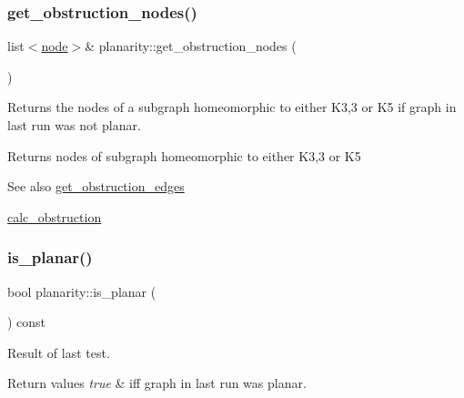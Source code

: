 \subsubsection{\texorpdfstring{get\+\_\+obstruction\+\_\+nodes()}{get\_obstruction\_nodes()}}
{\footnotesize\ttfamily list$<$\mbox{\hyperlink{classnode}{node}}$>$\& planarity\+::get\+\_\+obstruction\+\_\+nodes (\begin{DoxyParamCaption}{ }\end{DoxyParamCaption})\hspace{0.3cm}{\ttfamily [inline]}}



Returns the nodes of a subgraph homeomorphic to either K3,3 or K5 if graph in last run was not planar. 

\begin{DoxyReturn}{Returns}
nodes of subgraph homeomorphic to either K3,3 or K5
\end{DoxyReturn}
\begin{DoxySeeAlso}{See also}
\mbox{\hyperlink{classplanarity_ac9021696934cc24afbc36aa307b2919b}{get\+\_\+obstruction\+\_\+edges}} 

\mbox{\hyperlink{classplanarity_a7b8e8e5414a4eedb0f99253d3b62ffa3}{calc\+\_\+obstruction}} 
\end{DoxySeeAlso}
\mbox{\label{classplanarity_af60c3d06cffa7ce3a470797fd758be5f}} 
\subsubsection{\texorpdfstring{is\+\_\+planar()}{is\_planar()}}
{\footnotesize\ttfamily bool planarity\+::is\+\_\+planar (\begin{DoxyParamCaption}{ }\end{DoxyParamCaption}) const\hspace{0.3cm}{\ttfamily [inline]}}



Result of last test. 


\begin{DoxyRetVals}{Return values}
{\em true} & iff graph in last run was planar. \\
\hline
\end{DoxyRetVals}
\mbox{\label{classplanarity_af67236533dce559d2670eae581750f54}} 

